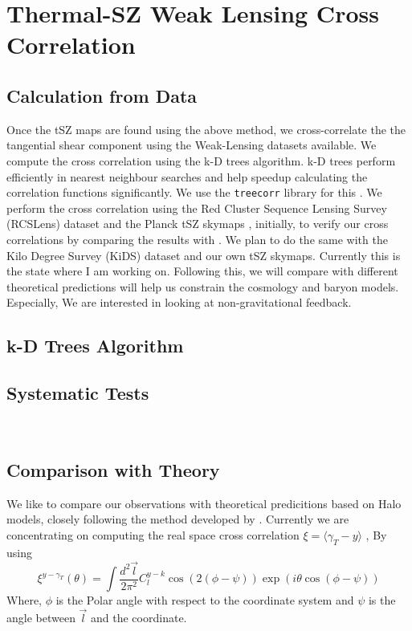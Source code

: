 \chapter{Thermal-SZ Weak Lensing Cross Correlation}
\section{Calculation from Data}
\label{tszcross}
Once the tSZ maps are found using the above method, we cross-correlate the the tangential
shear component using the Weak-Lensing datasets available.
We compute the cross correlation using
the k-D trees algorithm. k-D trees perform efficiently in nearest neighbour searches and help
speedup calculating the correlation functions significantly. We use the \texttt{treecorr} library
for this \cite{treecorr}. We perform the cross correlation
using the  Red Cluster Sequence Lensing Survey (RCSLens) dataset \cite{rcslens}
and the Planck tSZ skymaps \cite{plancksz}, initially, to verify our cross correlations by
comparing the results with \cite{tszrcscross}.
We plan to do the same with the Kilo Degree Survey (KiDS) dataset \cite{kidsdr4} and
our own tSZ skymaps. Currently this is the state where I am working on.
Following this, we will compare with different theoretical predictions will help us
constrain the cosmology and baryon models. Especially, We are interested in looking at
non-gravitational feedback.

\section{k-D Trees Algorithm}

\section{Systematic Tests}
\\

\section{Comparison with Theory}
\label{theory}
We like to compare our observations with theoretical predicitions based on Halo models, closely
following the method developed by 
\cite{halotheoryma}. Currently we are concentrating on computing the real space cross correlation
$ \xi = \langle \gamma_T - y \rangle$ , By using
\begin{equation}
  \label{realcrosstheory}
  \xi^{y - \gamma_T} (\theta) = \int \frac{d^2 \vec{l}}{2\pi^2 } C_l^{y-k} \cos(2(\phi - \psi)) \exp(i \theta \cos(\phi - \psi))
\end{equation}
Where, $\phi$ is the Polar angle with respect to the coordinate system and $\psi$ is the angle
between $\vec{l}$ and the coordinate.

